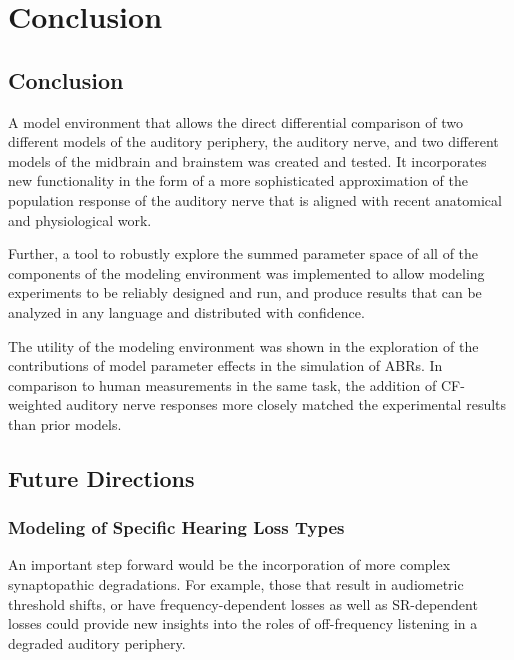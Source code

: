 \chapter{Conclusion}
\label{chapter:Conclusion}
\thispagestyle{myheadings}

\graphicspath{{7_Conclusion/Figures/}}

\section{Conclusion} %
\label{sec:conclusion}
A model environment that allows the direct differential comparison of two different models of the auditory periphery, the auditory nerve, and two different models of the midbrain and brainstem was created and tested.  It incorporates new functionality in the form of a more sophisticated approximation of the population response of the auditory nerve that is aligned with recent anatomical and physiological work.  

Further, a tool to robustly explore the summed parameter space of all of the components of the modeling environment was implemented to allow modeling experiments to be reliably designed and run, and produce results that can be analyzed in any language and distributed with confidence. 

The utility of the modeling environment was shown in the exploration of the contributions of model parameter effects in the simulation of ABRs.  In comparison to human measurements in the same task, the addition of CF-weighted auditory nerve responses more closely matched the experimental results than prior models.

\section{Future Directions} %
\label{sec:future_directions}
\subsection{Modeling of Specific Hearing Loss Types} %
\label{sub:modeling_of_specific_hearing_loss_types}
An important step forward would be the incorporation of more complex synaptopathic degradations.  For example, those that result in audiometric threshold shifts, or have frequency-dependent losses as well as SR-dependent losses could provide new insights into the roles of off-frequency listening in a degraded auditory periphery.

